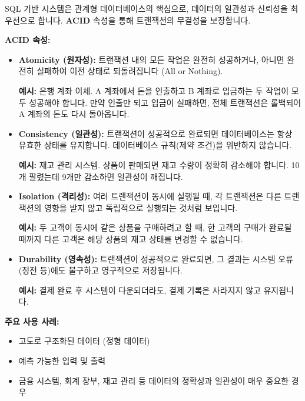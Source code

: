 \documentclass[11pt,a4paper]{article}
\theoremstyle{definition}
\begin{document}
\begin{summarybox}
SQL 기반 시스템은 관계형 데이터베이스의 핵심으로, 데이터의 일관성과 신뢰성을 최우선으로 합니다. \textbf{ACID} 속성을 통해 트랜잭션의 무결성을 보장합니다.
\end{summarybox}

\textbf{ACID 속성:}
\begin{itemize}
    \item \textbf{Atomicity (원자성):} 트랜잭션 내의 모든 작업은 완전히 성공하거나, 아니면 완전히 실패하여 이전 상태로 되돌려집니다 (All or Nothing).
    \begin{examplebox}
    \textbf{예시:} 은행 계좌 이체. A 계좌에서 돈을 인출하고 B 계좌로 입금하는 두 작업이 모두 성공해야 합니다. 만약 인출만 되고 입금이 실패하면, 전체 트랜잭션은 롤백되어 A 계좌의 돈도 다시 돌아옵니다.
    \end{examplebox}
    \item \textbf{Consistency (일관성):} 트랜잭션이 성공적으로 완료되면 데이터베이스는 항상 유효한 상태를 유지합니다. 데이터베이스 규칙(제약 조건)을 위반하지 않습니다.
    \begin{examplebox}
    \textbf{예시:} 재고 관리 시스템. 상품이 판매되면 재고 수량이 정확히 감소해야 합니다. 10개 팔렸는데 9개만 감소하면 일관성이 깨집니다.
    \end{examplebox}
    \item \textbf{Isolation (격리성):} 여러 트랜잭션이 동시에 실행될 때, 각 트랜잭션은 다른 트랜잭션의 영향을 받지 않고 독립적으로 실행되는 것처럼 보입니다.
    \begin{examplebox}
    \textbf{예시:} 두 고객이 동시에 같은 상품을 구매하려고 할 때, 한 고객의 구매가 완료될 때까지 다른 고객은 해당 상품의 재고 상태를 변경할 수 없습니다.
    \end{examplebox}
    \item \textbf{Durability (영속성):} 트랜잭션이 성공적으로 완료되면, 그 결과는 시스템 오류(정전 등)에도 불구하고 영구적으로 저장됩니다.
    \begin{examplebox}
    \textbf{예시:} 결제 완료 후 시스템이 다운되더라도, 결제 기록은 사라지지 않고 유지됩니다.
    \end{examplebox}
\end{itemize}

\textbf{주요 사용 사례:}
\begin{itemize}
    \item 고도로 구조화된 데이터 (정형 데이터)
    \item 예측 가능한 입력 및 출력
    \item 금융 시스템, 회계 장부, 재고 관리 등 데이터의 정확성과 일관성이 매우 중요한 경우
\end{itemize}
\end{document}

